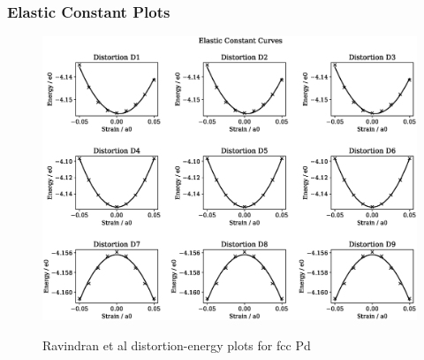 \clearpage
\subsubsection{Elastic Constant Plots}

\begin{figure}[htb]
\centering
\includegraphics[width=.90\linewidth]{chapters/potentials_fe_pd_ru/fepd_potential/ec_rfkj/elastic_strains_bp_0.eps}  
\label{fig:fepd-fefcc-distortions}
\caption{Ravindran et al\cite{dftrfkj} distortion-energy plots for \acrshort{fcc} Pd}
\end{figure}

